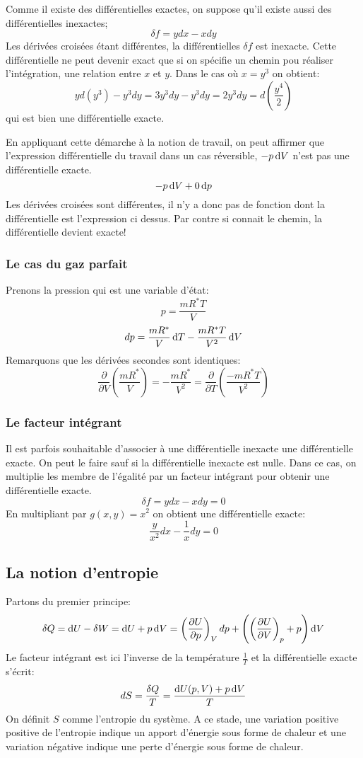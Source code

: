 Comme il existe des différentielles exactes,
on suppose qu'il existe aussi des différentielles inexactes;
\[ \delta f = ydx -xdy \]
Les dérivées croisées étant différentes,
la différentielles $\delta f$ est inexacte.
Cette différentielle ne peut devenir exact que si
on spécifie un chemin pou réaliser l'intégration, une relation entre $x$ et $y$.
Dans le cas où $x = y^3$ on obtient:
\[  yd(y^3)-y^3dy = 3y^3dy-y^3dy = 2y^3dy = d\left(\frac{y^4}{2}\right) \]
qui est bien une différentielle exacte.

En appliquant cette démarche à la notion de travail,
on peut affirmer que l'expression différentielle du travail
dans un cas réversible, $-p\operatorname{d}\! V$ n'est pas une différentielle exacte.
\[ -p\operatorname{d}\! V+0\operatorname{d}\! p \]
Les dérivées croisées sont différentes,
il n'y a donc pas de fonction dont la différentielle est l'expression ci dessus.
Par contre si connait le chemin, la différentielle devient exacte!
\subsubsection{Le cas du gaz parfait}
Prenons la pression qui est une variable d'état:
\[ p = \frac{mR^*T}{V} \]
\[ dp = \frac{mR^*}{V}\operatorname{d}\! T-\frac{mR^*T}{V^2}\operatorname{d}\! V \]
Remarquons que les dérivées secondes sont identiques:
\[ \frac{\partial}{\partial V} \left(\frac{mR^*}{V}\right) =
-\frac{mR^*}{V^2} = \frac{\partial}{\partial T}
\left(\frac{-mR^*T}{V^2}\right) \]

\subsubsection{Le facteur intégrant}
Il est parfois souhaitable d'associer à une différentielle
inexacte une différentielle exacte.
On peut le faire sauf si la différentielle inexacte est nulle.
Dans ce cas, on multiplie les membre de l'égalité par un facteur intégrant
pour obtenir une différentielle exacte.
\[ \delta f = ydx-xdy = 0 \]
En multipliant par $g(x,y) = x^2$ on obtient une différentielle exacte:
\[ \frac y {x^2} dx -\frac 1xdy = 0 \]
\subsection{La notion d'entropie}
Partons du premier principe:
\[ \delta Q = \operatorname{d}\! U - \delta W = \operatorname{d}\! U +p\operatorname{d}\! V =
\left(\frac{\partial U}{\partial p}\right)_V dp +
\left ( \left ( \frac{\partial U}{\partial V}\right)_p + p \right)\operatorname{d}\! V \]
Le facteur intégrant est ici l'inverse de la température
$\frac{1}{T}$ et la différentielle exacte s'écrit:
\[ dS = \frac{\delta Q}{T} = \frac{\operatorname{d}\! U(p,V)+p\operatorname{d}\! V }T \]
On définit $S$ comme l'entropie du système.
A ce stade, une variation positive positive de l'entropie
indique un apport d'énergie sous forme de chaleur et
une variation négative indique une perte d'énergie sous forme de chaleur.


